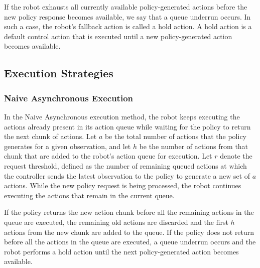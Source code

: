 \documentclass{article}
\begin{document}
If the robot exhausts all currently available policy-generated actions before the new policy response becomes available, we say that a queue underrun occurs. In such a case, the robot's fallback action is called a hold action. A hold action is a default control action that is executed until a new policy-generated action becomes available.

\subsection{Execution Strategies}

\subsubsection{Naive Asynchronous Execution}

In the Naive Asynchronous execution method, the robot keeps executing the actions already present in its action queue while waiting for the policy to return the next chunk of actions. Let \(a\) be the total number of actions that the policy generates for a given observation, and let \(h\) be the number of actions from that chunk that are added to the robot's action queue for execution. Let $r$ denote the request threshold, defined as the number of remaining queued actions at which the controller sends the latest observation to the policy to generate a new set of $a$ actions. While the new policy request is being processed, the robot continues executing the actions that remain in the current queue.

If the policy returns the new action chunk before all the remaining actions in the queue are executed, the remaining old actions are discarded and the first \(h\) actions from the new chunk are added to the queue. If the policy does not return before all the actions in the queue are executed, a queue underrun occurs and the robot performs a hold action until the next policy-generated action becomes available.
\end{document}
